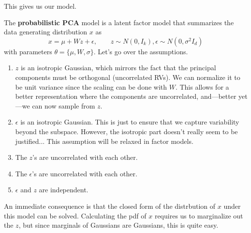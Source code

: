   This gives us our model. 

  \begin{definition} 
    The \textbf{probabilistic PCA} model is a latent factor model that summarizes the data generating distribution $x$ as  
    \begin{equation}
      x = \mu + W z + \epsilon, \qquad z \sim N(0, I_k), \epsilon \sim N(0, \sigma^2 I_d) 
    \end{equation} 
    with parameters $\theta = \{\mu, W, \sigma\}$. Let's go over the assumptions. 
    \begin{enumerate}
      \item $z$ is an isotropic Gaussian, which mirrors the fact that the principal components must be orthogonal (uncorrelated RVs). We can normalize it to be unit variance since the scaling can be done with $W$. This allows for a better representation where the components are uncorrelated, and---better yet---we can now sample from $z$. 
      \item $\epsilon$ is an isotropic Gaussian. This is just to ensure that we capture variability beyond the subspace. However, the isotropic part doesn't really seem to be justified... This assumption will be relaxed in factor models.  
      \item The $z$'s are uncorrelated with each other.  
      \item The $\epsilon$'s are uncorrelated with each other. 
      \item $\epsilon$ and $z$ are independent. 
    \end{enumerate}
  \end{definition} 

  An immediate consequence is that the closed form of the distrbution of $x$ under this model can be solved. Calculating the pdf of $x$ requires us to marginalize out the $z$, but since marginals of Gaussians are Gaussians, this is quite easy. 

